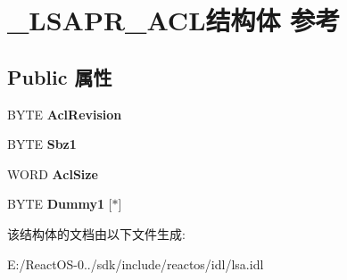 \hypertarget{struct___l_s_a_p_r___a_c_l}{}\section{\+\_\+\+L\+S\+A\+P\+R\+\_\+\+A\+C\+L结构体 参考}
\label{struct___l_s_a_p_r___a_c_l}
\subsection*{Public 属性}
\begin{DoxyCompactItemize}
\item 
\mbox{\label{struct___l_s_a_p_r___a_c_l_a8b1bc89be5730a70b5a92d13b8c61765}} 
B\+Y\+TE {\bfseries Acl\+Revision}
\item 
\mbox{\label{struct___l_s_a_p_r___a_c_l_a1c76d83f8811343e171b3dec6106142a}} 
B\+Y\+TE {\bfseries Sbz1}
\item 
\mbox{\label{struct___l_s_a_p_r___a_c_l_af90c7a3383bdcedd629f64ec39245a2a}} 
W\+O\+RD {\bfseries Acl\+Size}
\item 
\mbox{\label{struct___l_s_a_p_r___a_c_l_a41a908a1ff16fc425d252c4457820c84}} 
B\+Y\+TE {\bfseries Dummy1} \mbox{[}$\ast$\mbox{]}
\end{DoxyCompactItemize}


该结构体的文档由以下文件生成\+:\begin{DoxyCompactItemize}
\item 
E\+:/\+React\+O\+S-\/0../sdk/include/reactos/idl/lsa.\+idl\end{DoxyCompactItemize}
